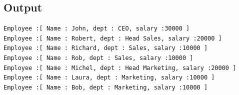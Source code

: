 \subsection{Output}

\begin{verbatim}
Employee :[ Name : John, dept : CEO, salary :30000 ]
Employee :[ Name : Robert, dept : Head Sales, salary :20000 ]
Employee :[ Name : Richard, dept : Sales, salary :10000 ]
Employee :[ Name : Rob, dept : Sales, salary :10000 ]
Employee :[ Name : Michel, dept : Head Marketing, salary :20000 ]
Employee :[ Name : Laura, dept : Marketing, salary :10000 ]
Employee :[ Name : Bob, dept : Marketing, salary :10000 ]
\end{verbatim}
